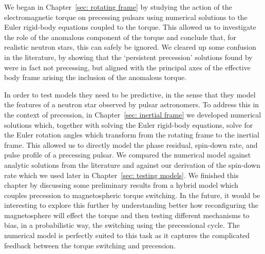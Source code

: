 \documentclass[twoside, 11pt]{thesis}
\begin{document}
We began in Chapter~\ref{sec: rotating frame} by studying the action of the
electromagnetic torque on precessing pulsars using numerical solutions to the
Euler rigid-body equations coupled to the \citet{Deutsch1955} torque. This
allowed us to investigate the role of the anomalous component of the torque and
conclude that, for realistic neutron stars, this can safely be ignored. We
cleared up some confusion in the literature, by showing that the `persistent
precession' solutions found by \citet{Melatos2000} were in fact not
precessing, but aligned with the principal axes of the effective body frame
arising the inclusion of the anomalous torque.

In order to test models they need to be predictive, in the sense that they
model the features of a neutron star observed by pulsar astronomers. To address
this in the context of precession, in Chapter~\ref{sec: inertial frame} we
developed numerical solutions which, together with solving the Euler rigid-body
equations, solve for the Euler rotation angles which transform from the
rotating frame to the inertial frame. This allowed us to directly model the
phase residual, spin-down rate, and pulse profile of a precessing pulsar.
We compared the numerical model against analytic solutions from the literature
and against our derivation of the spin-down rate which we used later in
Chapter~\ref{sec: testing models}. We finished this chapter by discussing some
preliminary results from a hybrid model which couples precession to
magnetospheric torque switching. In the future, it would be interesting to explore
this further by understanding better how reconfiguring the magnetosphere will
effect the \citet{Deutsch1955} torque and then testing different mechanisms to
bias, in a probabilistic way, the switching using the precessional cycle. The
numerical model is perfectly suited to this task as it captures the complicated
feedback between the torque switching  and precession.
\end{document}
